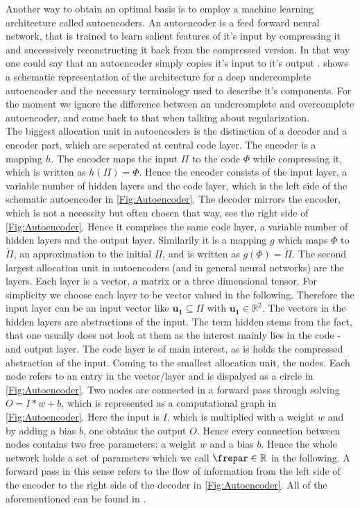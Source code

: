 Another way to obtain an optimal basis is to employ a machine learning architecture called autoencoders. An autoencoder is a feed forward neural network, that is trained to learn salient features of it's input by compressing it and successively reconstructing it back from the compressed version. In that way one could say that an autoencoder simply copies it's input to it's output \cite{Goodfellow}.  shows a schematic representation of the architecture for a deep undercomplete autoencoder and the necessary terminology used to describe it's components. For the moment we ignore the difference between an undercomplete and overcomplete autoencoder, and come back to that when talking about regularization.\\
The biggest allocation unit in autoencoders is the distinction of a decoder and a encoder part, which are seperated at central code layer. The encoder is a mapping \(h\). The encoder maps the input \(\Pi\) to the code \(\Phi\) while compressing it, which is written as \(h(\Pi)=\Phi\). Hence the encoder consists of the input layer, a variable number of hidden layers and the code layer, which is the left side of the schematic autoencoder in \cref{Fig:Autoencoder}. The decoder mirrors the encoder, which is not a necessity but often chosen that way, see the right side of \cref{Fig:Autoencoder}. Hence it comprises the same code layer, a variable number of hidden layers and the output layer. Similarily it is a mapping \(g\) which maps \(\Phi\) to \(\tilde{\Pi}\), an approximation to the initial \(\Pi\), and is written as \(g(\Phi)=\tilde{\Pi}\). The second largest allocation unit in autoencoders (and in general neural networks) are the layers. Each layer is a vector, a matrix or a three dimensional tensor. For simplicity we choose each layer to be vector valued in the following. Therefore the input layer can be an input vector like \(\mathbf{u_1}\subseteq \Pi\) with \(\mathbf{u_1} \in \mathbb{R}^2\). The vectors in the hidden layers are abstractions of the input. The term hidden stems from the fact, that one usually does not look at them as the interest mainly lies in the code -and output layer. The code layer is of main interest, as is holds the compressed abstraction of the input. Coming to the smallest allocation unit, the nodes. Each node refers to an entry in the vector/layer and is dispalyed as a circle in \cref{Fig:Autoencoder}. Two nodes are connected in a forward pass through solving \(O=I*w+b\), which is represented as a computational graph in \cref{Fig:Autoencoder}. Here the input is \(I\), which is multiplied with a weight \(w\) and by adding a bias \(b\), one obtains the output \(O\). Hence every connection between nodes contains two free parameters: a weight \(w\) and a bias \(b\). Hence the whole network holds a set of parameters which we call \(\frepar \in \mathbb{R}\) in the following. A forward pass in this sense refers to the flow of information from the left side of the encoder to the right side of the decoder in \cref{Fig:Autoencoder}. All of the aforementioned can be found in \cite{Goodfellow}.\\
